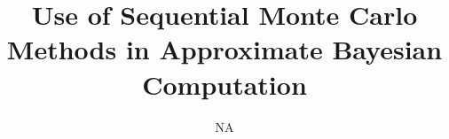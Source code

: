 \titlepage
\title{Use of Sequential Monte Carlo Methods in Approximate Bayesian Computation}
\author{NA}
\maketitle

